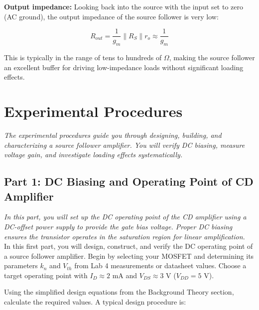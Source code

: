 \documentclass[10pt]{article}
\begin{document}
\textbf{Output impedance:} Looking back into the source with the input set to zero (AC ground), the output impedance of the source follower is very low: 

\begin{equation}
    R_{out} = \frac{1}{g_m} \parallel R_S \parallel r_o \approx \frac{1}{g_m}
    \label{eq:rout_cd}
\end{equation}

This is typically in the range of tens to hundreds of $\Omega$, making the source follower an excellent buffer for driving low-impedance loads without significant loading effects.

\section{Experimental Procedures}

\textit{The experimental procedures guide you through designing, building, and characterizing a source follower amplifier. You will verify DC biasing, measure voltage gain, and investigate loading effects systematically.} \\

\subsection{Part 1: DC Biasing and Operating Point of CD Amplifier}

\textit{In this part, you will set up the DC operating point of the CD amplifier using a DC-offset power supply to provide the gate bias voltage. Proper DC biasing ensures the transistor operates in the saturation region for linear amplification.} \\

In this first part, you will design, construct, and verify the DC operating point of a source follower amplifier. Begin by selecting your MOSFET and determining its parameters $k_n$ and $V_{th}$ from Lab 4 measurements or datasheet values. Choose a target operating point with $I_D \approx 2$ mA and $V_{DS} \approx 3$ V ($V_{DD} = 5$ V).

Using the simplified design equations from the Background Theory section, calculate the required values. A typical design procedure is:
\end{document}
